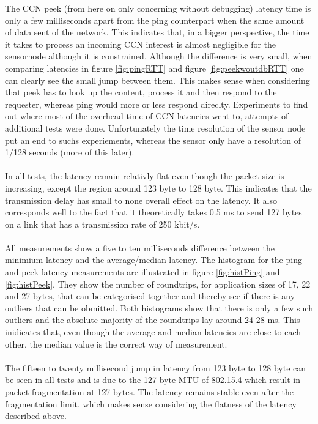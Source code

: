 The CCN peek (from here on only concerning without debugging) latency time is only a few milliseconds apart from the ping counterpart when the same amount of data sent of the network. This indicates that, in a bigger perspective, the time it takes to process an incoming CCN interest is almost negligible for the sensornode although it is constrained. Although the difference is very small, when comparing latencies in figure \ref{fig:pingRTT} and figure \ref{fig:peekwoutdbRTT} one can clearly see the small jump between them. This makes sense when considering that peek has to look up the content, process it and then respond to the requester, whereas ping would more or less respond direclty. Experiments to find out where most of the overhead time of CCN latencies went to, attempts of additional tests were done. Unfortunately the time resolution of the sensor node put an end to suchs experiements, whereas the sensor only have a resolution of 1/128 seconds (more of this later).
\\\\
In all tests, the latency remain relativly flat even though the packet size is increasing, except the region around 123 byte to 128 byte. This indicates that the transmission delay has small to none overall effect on the latency. It also corresponds well to the fact that it theoretically takes 0.5 ms to send 127 bytes on a link that has a transmission rate of 250 kbit/s.
\\\\
All measurements show a five to ten milliseconds difference between the minimium latency and the average/median latency. The histogram for the ping and peek latency measurements are illustrated in figure \ref{fig:histPing} and \ref{fig:histPeek}. They show the number of roundtrips, for application sizes of 17, 22 and 27 bytes, that can be categorised together and thereby see if there is any outliers that can be obmitted. Both histograms show that there is only a few such outliers and the absolute majority of the roundtrips lay around 24-28 ms. This inidicates that, even though the average and median latencies are close to each other, the median value is the correct way of measurement.
\\\\
The fifteen to twenty millisecond jump in latency from 123 byte to 128 byte can be seen in all tests and is due to the 127 byte MTU of 802.15.4 which result in packet fragmentation at 127 bytes. The latency remains stable even after the fragmentation limit, which makes sense considering the flatness of the latency described above.

